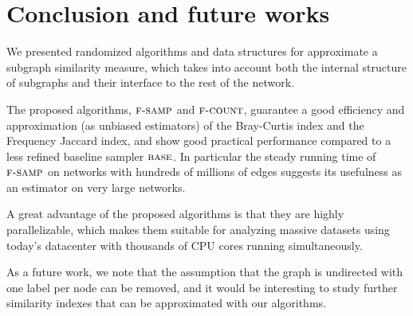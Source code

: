 \chapter{Conclusion and future works}
    
We presented randomized algorithms and data structures for approximate a subgraph similarity measure, which takes into account both the internal structure of subgraphs and their interface to the rest of the network. \medskip

The proposed algorithms, $\textsc{f-samp}$ and $\textsc{f-count}$, guarantee a good efficiency and approximation (as unbiased estimators) of the Bray-Curtis index and the Frequency Jaccard index, and show good practical performance compared to a less refined baseline sampler $\textsc{base}$. In particular the steady running time of $\textsc{f-samp}$ on networks with hundreds of millions of edges suggests its usefulness as an estimator on very large networks.\medskip

A great advantage of the proposed algorithms is that they are highly parallelizable, which makes them suitable for analyzing massive datasets using today's datacenter with thousands of CPU cores running simultaneously.\medskip

As a future work, we note that the assumption that the graph is undirected with one label per node can be removed, and it would be interesting to study further similarity indexes that can be approximated with our algorithms.